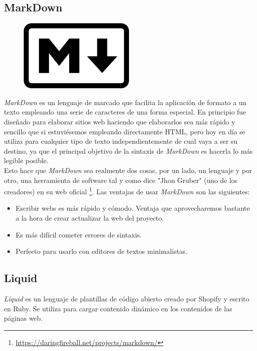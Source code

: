 \documentclass[a4paper, 12pt]{book}
\begin{document}
\subsection{MarkDown}
\label{subsec:markdo}
\begin{figure}[h]
    \centering
    \includegraphics[scale=0.6]{img/logo_markdown.png}
    \label{fig:logoMd}
\end{figure}
\emph{MarkDown} es un lenguaje de marcado que facilita la aplicación de formato a un texto empleando una serie de caracteres de una forma especial. En principio fue diseñado para elaborar sitios web haciendo que elaborarlos sea más rápido y sencillo que si estuviésemos empleando directamente HTML, pero hoy en día se utiliza para cualquier tipo de texto independientemente de cual vaya a ser su destino, ya que el principal objetivo de la sintaxis de \emph{MarkDown} es hacerla lo más legible posible. \\
Esto hace que \emph{MarkDown} sea realmente dos cosas, por un lado, un lenguaje y por otro, una herramienta de software tal y como dice "Jhon Gruber" (uno de los creadores) en su web oficial \footnote{\url{https://daringfireball.net/projects/markdown/}}. 
Las ventajas de usar \emph{MarkDown} son las siguientes:
\begin{itemize}
    \item Escribir webs es más rápido y cómodo. Ventaja que aprovecharemos bastante a la hora de crear actualizar la web del proyecto.
    \item Es más difícil cometer errores de sintaxis.
    \item Perfecto para usarlo con editores de textos minimalistas.    
\end{itemize}
\subsection{Liquid}
\label{subse:liquid}
\emph{Liquid} es un lenguaje de plantillas de código abierto creado por Shopify y escrito en Ruby. Se utiliza para cargar contenido dinámico en los contenidos de las páginas web. 
\end{document}
